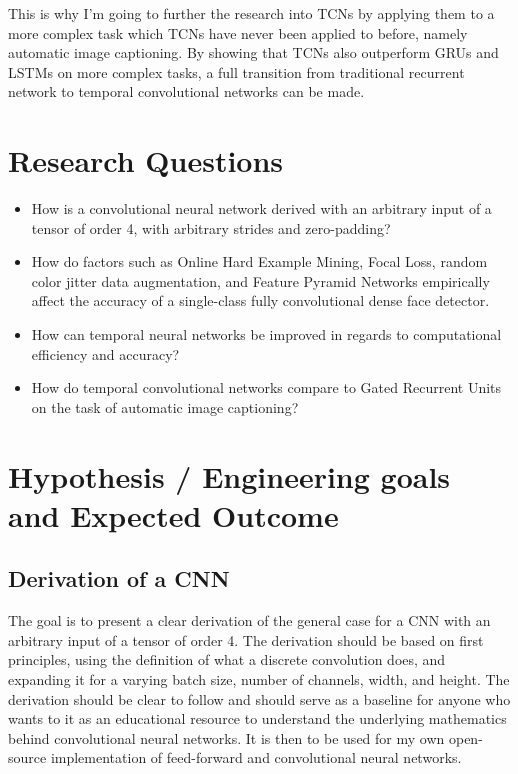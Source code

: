 \documentclass[a4paper, twoside]{article}
\begin{document}
This is why I'm going to further the research into TCNs by applying them to a more complex task which TCNs have never been applied to before, namely automatic image captioning. By showing that TCNs also outperform GRUs and LSTMs on more complex tasks, a full transition from traditional recurrent network to temporal convolutional networks can be made.

\section{Research Questions}
\begin{itemize}
\item How is a convolutional neural network derived with an arbitrary input of a tensor of order 4, with arbitrary strides and zero-padding?

\item How do factors such as Online Hard Example Mining, Focal Loss, random color jitter data augmentation, and Feature Pyramid Networks empirically affect the accuracy of a single-class fully convolutional dense face detector.

\item How can temporal neural networks be improved in regards to computational efficiency and accuracy?

\item How do temporal convolutional networks compare to Gated Recurrent Units on the task of automatic image captioning?
\end{itemize}

\section{Hypothesis / Engineering goals and Expected Outcome}
\subsection{Derivation of a CNN}
The goal is to present a clear derivation of the general case for a CNN with an arbitrary input of a tensor of order 4. The derivation should be based on first principles, using the definition of what a discrete convolution does, and expanding it for a varying batch size, number of channels, width, and height. The derivation should be clear to follow and should serve as a baseline for anyone who wants to it as an educational resource to understand the underlying mathematics behind convolutional neural networks. It is then to be used for my own open-source implementation of feed-forward and convolutional neural networks.
\end{document}
